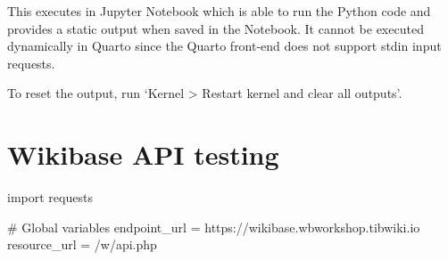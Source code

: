 \documentclass[
  letterpaper,
  DIV=11,
  numbers=noendperiod]{scrreprt}
\newenvironment{Shaded}{\begin{snugshade}}{\end{snugshade}}
\newcommand{\CommentTok}[1]{\textcolor[rgb]{0.37,0.37,0.37}{#1}}
\newcommand{\ImportTok}[1]{\textcolor[rgb]{0.00,0.46,0.62}{#1}}
\newcommand{\NormalTok}[1]{\textcolor[rgb]{0.00,0.23,0.31}{#1}}
\newcommand{\OperatorTok}[1]{\textcolor[rgb]{0.37,0.37,0.37}{#1}}
\newcommand{\StringTok}[1]{\textcolor[rgb]{0.13,0.47,0.30}{#1}}
\begin{document}
This executes in Jupyter Notebook which is able to run the Python code
and provides a static output when saved in the Notebook. It cannot be
executed dynamically in Quarto since the Quarto front-end does not
support stdin input requests.

To reset the output, run `Kernel \textgreater{} Restart kernel and clear
all outputs'.

\hypertarget{wikibase-api-testing}{%
\section{Wikibase API testing}\label{wikibase-api-testing}}

\begin{Shaded}
\begin{Highlighting}[]
\ImportTok{import}\NormalTok{ requests}

\CommentTok{\# Global variables}
\NormalTok{endpoint\_url }\OperatorTok{=} \StringTok{\textquotesingle{}https://wikibase.wbworkshop.tibwiki.io\textquotesingle{}}
\NormalTok{resource\_url }\OperatorTok{=} \StringTok{\textquotesingle{}/w/api.php\textquotesingle{}}


\end{Highlighting}
\end{Shaded}
\end{document}
